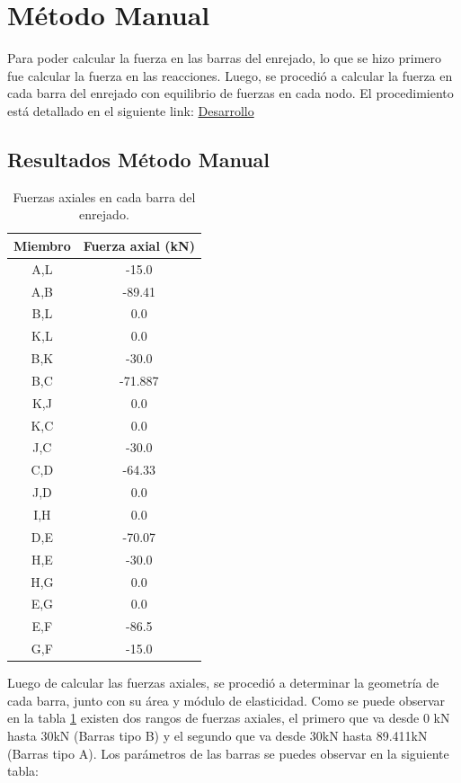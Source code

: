 \documentclass{article}  %
\begin{document}
\newpage
\section{Método Manual}
Para poder calcular la fuerza en las barras del enrejado, lo que se hizo primero fue calcular la fuerza en las reacciones. Luego, se procedió a calcular la fuerza en cada barra del enrejado con equilibrio de fuerzas en cada nodo. El procedimiento está detallado en el siguiente link: \href{https://github.com/berckanala/P2E0_MCOC/tree/main/desarrollo}{Desarrollo}

\subsection{Resultados Método Manual}
\begin{table}[h!]
  \centering
  \begin{tabular}{cc}
  \hline
  \textbf{Miembro} & \textbf{Fuerza axial (kN)} \\
  \hline
  A,L  & -15.0   \\
  A,B  & -89.41 \\
  B,L  & 0.0     \\
  K,L  & 0.0    \\
  B,K  & -30.0   \\
  B,C  & -71.887 \\
  K,J  & 0.0  \\
  K,C  & 0.0   \\
  J,C  & -30.0   \\
  C,D & -64.33 \\
  J,D & 0.0  \\
  I,H & 0.0    \\
  D,E & -70.07 \\
  H,E & -30.0   \\
  H,G & 0.0     \\
  E,G & 0.0    \\
  E,F & -86.5 \\
  G,F & -15.0   \\
  \hline
  \end{tabular}
  \caption{Fuerzas axiales en cada barra del enrejado.}
  \label{tab:1}
\end{table}
Luego de calcular las fuerzas axiales, se procedió a determinar la geometría de cada barra, junto con su área y módulo de elasticidad. Como se puede observar en la tabla \ref{tab:1} existen dos rangos de fuerzas axiales, el primero que va desde 0 kN hasta 30kN (Barras tipo B) y el segundo que va desde 30kN hasta 89.411kN (Barras tipo A). Los parámetros de las barras se puedes observar en la siguiente tabla:
\end{document}
